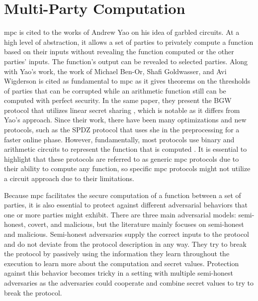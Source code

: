 \section{Multi-Party Computation}
\label{sec:mpc}

\acrshort{mpc} is cited to the works of Andrew Yao \cite{FOCS:Yao86, STOC:GolMicWig87} on his idea of garbled circuits. At a high level of abstraction, it allows a set of parties to privately compute a function based on their inputs without revealing the function computed or the other parties' inputs. The function's output can be revealed to selected parties. Along with Yao's work, the work of Michael Ben-Or, Shafi Goldwasser, and Avi Wigderson \cite{STOC:BenGolWig88} is cited as fundamental to \acrshort{mpc} as it gives theorems on the thresholds of parties that can be corrupted while an arithmetic function still can be computed with perfect security. In the same paper, they present the BGW protocol that utilizes linear secret sharing \cite{TCC:KomNaoYog16}, which is notable as it differs from Yao's approach. Since their work, there have been many optimizations and new protocols, such as the SPDZ protocol \cite{EPRINT:DPSZ11} that uses \acrfull{she} in the preprocessing for a faster online phase. However, fundamentally, most protocols use binary and arithmetic circuits to represent the function that is computed \cite{STOC:Gentry09, CCS:KelOrsSch16, C:GLOPS21, EC:KelPasRot18}. It is essential to highlight that these protocols are referred to as generic \acrshort{mpc} protocols due to their ability to compute any function, so specific \acrshort{mpc} protocols might not utilize a circuit approach due to their limitations.

Because \acrshort{mpc} facilitates the secure computation of a function between a set of parties, it is also essential to protect against different adversarial behaviors that one or more parties might exhibit. There are three main adversarial models: semi-honest, covert, and malicious, but the literature mainly focuses on semi-honest and malicious. Semi-honest adversaries supply the correct inputs to the protocol and do not deviate from the protocol description in any way. They try to break the protocol by passively using the information they learn throughout the execution to learn more about the computation and secret values. Protection against this behavior becomes tricky in a setting with multiple semi-honest adversaries as the adversaries could cooperate and combine secret values to try to break the protocol.

